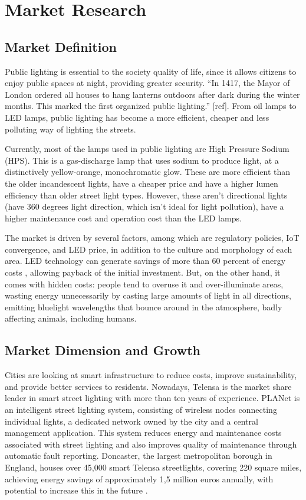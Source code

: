 \section{Market Research}
\subsection{Market Definition}
Public lighting is essential to the society quality of life, since it allows citizens to enjoy public spaces at night, providing greater security. “In 1417, the Mayor of London ordered all houses to hang lanterns outdoors after dark during the winter months. This marked the first organized public lighting.” [ref]. From oil lamps to LED lamps, public lighting has become a more efficient, cheaper and less polluting way of lighting the streets. 

Currently, most of the lamps used in public lighting are High Pressure Sodium (HPS). This is a gas-discharge lamp that uses sodium to produce light, at a distinctively yellow-orange, monochromatic glow. These are more efficient than the older incandescent lights, have a cheaper price and have a higher lumen efficiency than older street light types. However, these aren’t directional lights (have 360 degrees light direction, which isn't ideal for light pollution), have a higher maintenance cost and operation cost than the LED lamps. 

The market is driven by several factors, among which are regulatory policies, IoT convergence, and LED price, in addition to the culture and morphology of each area. LED technology can generate savings of more than 60 percent of energy costs \cite{light_pollution}, allowing payback of the initial investment. But, on the other hand, it comes with hidden costs: people tend to overuse it and over-illuminate areas, wasting energy unnecessarily by casting large amounts of light in all directions, emitting bluelight wavelengths that bounce around in the atmosphere, badly affecting animals, including humans.

\subsection{Market Dimension and Growth}

Cities are looking at smart infrastructure to reduce costs, improve sustainability, and provide better services to residents. Nowadays, Telensa is the market share leader in smart street lighting with more than ten years of experience. PLANet is an  intelligent street lighting system, consisting of wireless nodes connecting individual lights, a dedicated network owned by the city and a central management application. This system reduces energy and maintenance costs associated with street lighting and also improves quality of maintenance through automatic fault reporting. Doncaster, the largest metropolitan borough in England, houses over 45,000 smart Telensa streetlights, covering 220 square miles, achieving energy savings of approximately 1,5 million euros annually, with potential to increase this in the future \cite{telensa}.

